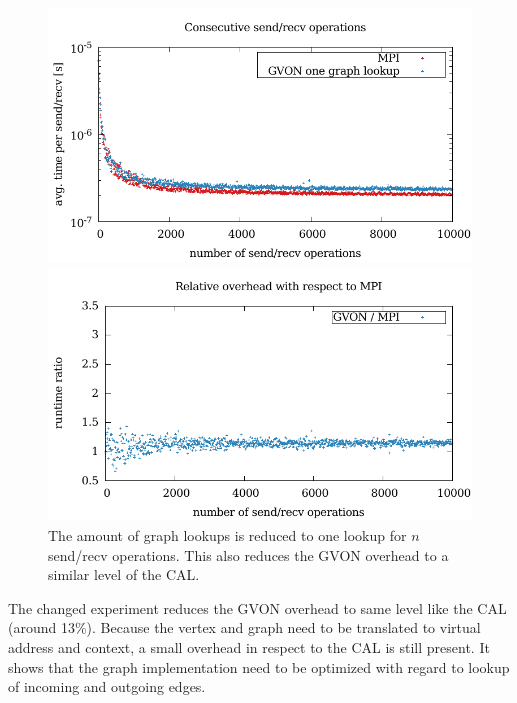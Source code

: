 \begin{figure}[H]
  \begin{minipage}[t]{0.5\textwidth} 
    \includegraphics[width=\textwidth]{plots/50_nsend_one_lookup_kepler}
  \end{minipage}
  \begin{minipage}[t]{0.5\textwidth}
    \includegraphics[width=\textwidth]{plots/50_nsend_one_lookup_overhead_gvon_kepler}
  \end{minipage}
  \label{fig:nsend_one_lookup_kepler}
  \caption{The amount of graph lookups is reduced to one lookup for
    $n$ send/recv operations.  This also reduces the GVON overhead to
    a similar level of the CAL.}
\end{figure}


The changed experiment reduces the GVON overhead to same level like
the CAL (around 13\%). Because the vertex and graph need to be
translated to virtual address and context, a small overhead in respect
to the CAL is still present. It shows that the graph implementation
need to be optimized with regard to lookup of incoming and outgoing
edges.

